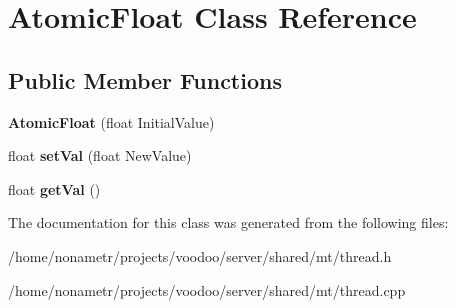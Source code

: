 \hypertarget{classAtomicFloat}{\section{\-Atomic\-Float \-Class \-Reference}
\label{classAtomicFloat}
}
\subsection*{\-Public \-Member \-Functions}
\begin{DoxyCompactItemize}
\item 
\hypertarget{classAtomicFloat_a3b18907aa5d736361d0711bbb53b23b0}{{\bfseries \-Atomic\-Float} (float \-Initial\-Value)}\label{classAtomicFloat_a3b18907aa5d736361d0711bbb53b23b0}

\item 
\hypertarget{classAtomicFloat_a4e59fd811f0cf118e5be5c278374a060}{float {\bfseries set\-Val} (float \-New\-Value)}\label{classAtomicFloat_a4e59fd811f0cf118e5be5c278374a060}

\item 
\hypertarget{classAtomicFloat_accd3d0c651d3ee96078ecff6416ef8e1}{float {\bfseries get\-Val} ()}\label{classAtomicFloat_accd3d0c651d3ee96078ecff6416ef8e1}

\end{DoxyCompactItemize}


\-The documentation for this class was generated from the following files\-:\begin{DoxyCompactItemize}
\item 
/home/nonametr/projects/voodoo/server/shared/mt/thread.\-h\item 
/home/nonametr/projects/voodoo/server/shared/mt/thread.\-cpp\end{DoxyCompactItemize}
